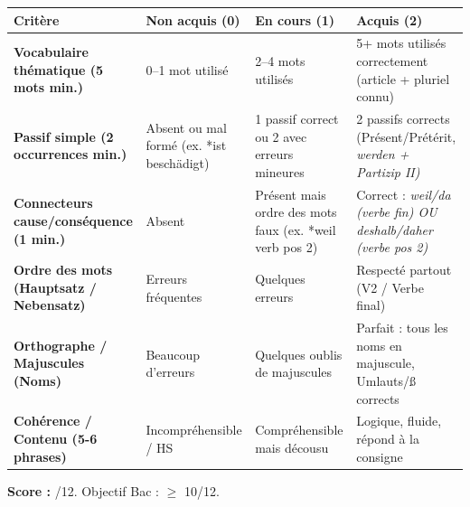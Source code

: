 \documentclass[11pt]{article}
\newcommand{\all}[1]{\ifmmode\text{\textit{#1}}\else\begingroup\selectlanguage{ngerman}\itshape #1\endgroup\fi}
\begin{document}
\begin{definition}
\begin{center}
\begin{tabularx}{\linewidth}{|>{\bfseries}X|X|X|X|}\hline
\rowcolor{popblueL} \textbf{Critère} & \textbf{Non acquis (0)} & \textbf{En cours (1)} & \textbf{Acquis (2)} \\ \hline
Vocabulaire thématique (5 mots min.) & 0--1 mot utilisé & 2--4 mots utilisés & 5+ mots utilisés correctement (article + pluriel connu) \\ \hline
Passif simple (2 occurrences min.) & Absent ou mal formé (ex. *ist beschädigt) & 1 passif correct ou 2 avec erreurs mineures & 2 passifs corrects (Présent/Prétérit, \all{werden} + Partizip II) \\ \hline
Connecteurs cause/conséquence (1 min.) & Absent & Présent mais ordre des mots faux (ex. *weil verb pos 2) & Correct : \all{weil/da} (verbe fin) OU \all{deshalb/daher} (verbe pos 2) \\ \hline
Ordre des mots (Hauptsatz / Nebensatz) & Erreurs fréquentes & Quelques erreurs & Respecté partout (V2 / Verbe final) \\ \hline
Orthographe / Majuscules (Noms) & Beaucoup d'erreurs & Quelques oublis de majuscules & Parfait : tous les noms en majuscule, Umlauts/ß corrects \\ \hline
Cohérence / Contenu (5-6 phrases) & Incompréhensible / HS & Compréhensible mais décousu & Logique, fluide, répond à la consigne \\ \hline
\end{tabularx}
\end{center}
\textbf{Score :} /12. Objectif Bac : $\ge$ 10/12.
\end{definition}
\end{document}
